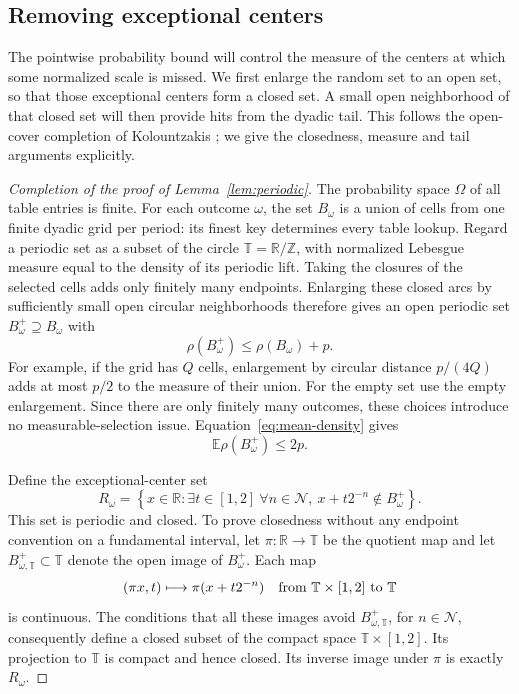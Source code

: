 \subsection{Removing exceptional centers}
\label{subsec:repair}

The pointwise probability bound will control the measure of the centers
at which some normalized scale is missed.  We first enlarge the random
set to an open set, so that those exceptional centers form a closed
set.  A small open neighborhood of that closed set will then provide
hits from the dyadic tail.
This follows the open-cover completion of Kolountzakis
\cite[Sections~2.2 and~3.2]{Kolountzakis1997};
we give the closedness, measure and tail arguments explicitly.

\begin{proof}[Completion of the proof of Lemma~\ref{lem:periodic}]
The probability space \(\Omega\) of all table entries is finite.
For each outcome \(\omega\), the set \(B_\omega\) is a union of cells
from one finite dyadic grid per period: its finest key determines
every table lookup.  Regard a periodic set as a subset of the circle
\(\mathbb T=\mathbb R/\mathbb Z\), with normalized Lebesgue measure
equal to the density of its periodic lift.  Taking the closures of the selected
cells adds only finitely many endpoints.  Enlarging these closed arcs
by sufficiently small open circular neighborhoods therefore gives an
open periodic set \(B_\omega^+\supseteq B_\omega\) with
\begin{equation}
 \rho(B_\omega^+)\le\rho(B_\omega)+p.
 \label{eq:open-enlargement}
\end{equation}
For example, if the grid has \(Q\) cells, enlargement by circular
distance \(p/(4Q)\) adds at most \(p/2\) to the measure of their union.
For the empty set use the empty enlargement.  Since there are only
finitely many outcomes, these choices introduce no measurable-selection
issue.  Equation~\eqref{eq:mean-density} gives
\begin{equation}
 \mathbb E\rho(B_\omega^+)\le2p.
 \label{eq:open-mean}
\end{equation}

Define the exceptional-center set
\begin{equation}
 R_\omega=
 \left\{x\in\mathbb R:
   \exists t\in[1,2]\ \forall n\in\mathcal N,\
          x+t2^{-n}\notin B_\omega^+\right\}.
 \label{eq:exceptional-centers}
\end{equation}
This set is periodic and closed.  To prove closedness without any
endpoint convention on a fundamental interval, let
\(\pi:\mathbb R\to\mathbb T\) be the quotient map and let
\(B_{\omega,\mathbb T}^+\subset\mathbb T\) denote the open image of
\(B_\omega^+\).  Each map
\[
 (\pi x,t)\longmapsto\pi(x+t2^{-n})
 \quad\hbox{from }\mathbb T\times[1,2]\hbox{ to }\mathbb T
\]
is continuous.  The conditions that all these images avoid
\(B_{\omega,\mathbb T}^+\), for \(n\in\mathcal N\), consequently define
a closed subset of the compact space \(\mathbb T\times[1,2]\).
Its projection to \(\mathbb T\) is compact and hence closed.
Its inverse image under \(\pi\) is exactly \(R_\omega\).


\end{proof}
